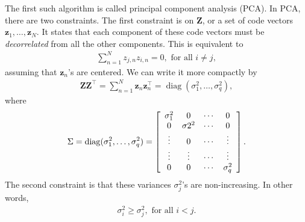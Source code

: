 \documentclass{report}
\newcommand{\vect}[1]{\mathbf{#1}}
\newcommand{\matr}[1]{\mathbf{#1}}
\newcommand{\diag}[0]{\operatorname{diag}}
\newcommand{\vz}[0]{\vect{z}}
\newcommand{\mZ}[0]{\matr{Z}}
\begin{document}
The first such algorithm is called principal component analysis (PCA). In PCA,
there are two constraints. The first constraint is on $\mZ$, or a set of code
vectors $\vz_1, \ldots, \vz_N$. It states that each component of these code
vectors must be {\it decorrelated} from all the other components. This is
equivalent to 
\begin{align*}
    \sum_{n=1}^N z_{j,n} z_{i,n} = 0,\text{ for all }i \neq j,
\end{align*}
assuming that $\vz_n$'s are centered. We can write it more compactly by
\begin{align*}
    \mZ \mZ^\top = \sum_{n=1}^N \vz_{n} \vz_n^\top = \diag(\sigma_1^2, \ldots, \sigma_q^2),
\end{align*}
where 
\begin{align*}
    \Sigma = \diag(\sigma_1^2, \ldots, \sigma_q^2) = 
    \left[
        \begin{array}{c c c c}
            \sigma_1^2 & 0 & \cdots & 0 \\
            0 & \sigma2^2 & \cdots & 0 \\
            \vdots & 0 & \cdots & \vdots \\
            \vdots & \vdots & \cdots & \vdots \\
            0 & 0 & \cdots & \sigma_q^2 
        \end{array}
    \right].
\end{align*}
The second constraint is that these variances $\sigma_j^2$'s are non-increasing.
In other words, 
\begin{align*}
    \sigma_i^2 \geq \sigma_j^2,\text{ for all }i < j.
\end{align*}
\end{document}
